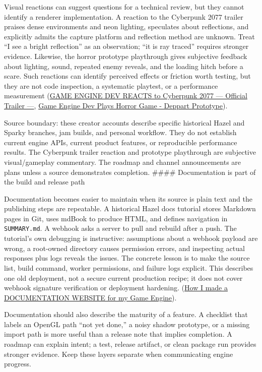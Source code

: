 Visual reactions can suggest questions for a technical review, but they cannot identify a renderer implementation. A reaction to the Cyberpunk 2077 trailer praises dense environments and neon lighting, speculates about reflections, and explicitly admits the capture platform and reflection method are unknown. Treat ``I see a bright reflection'' as an observation; ``it is ray traced'' requires stronger evidence. Likewise, the horror prototype playthrough gives subjective feedback about lighting, sound, repeated enemy reveals, and the loading hitch before a scare. Such reactions can identify perceived effects or friction worth testing, but they are not code inspection, a systematic playtest, or a performance measurement (\href{https://www.youtube.com/watch?v=ZyfFCIFHYuk&t=1m11s}{GAME ENGINE DEV REACTS to Cyberpunk 2077 --- Official Trailer ---}, \href{https://www.youtube.com/watch?v=Y3-p6MlTjLA&t=0m0s}{Game Engine Dev Plays Horror Game - Deppart Prototype}).

Source boundary: these creator accounts describe specific historical Hazel and Sparky branches, jam builds, and personal workflow. They do not establish current engine APIs, current product features, or reproducible performance results. The Cyberpunk trailer reaction and prototype playthrough are subjective visual/gameplay commentary. The roadmap and channel announcements are plans unless a source demonstrates completion. \#\#\#\# Documentation is part of the build and release path

Documentation becomes easier to maintain when its source is plain text and the publishing steps are repeatable. A historical Hazel docs tutorial stores Markdown pages in Git, uses mdBook to produce HTML, and defines navigation in \texttt{SUMMARY.md}. A webhook asks a server to pull and rebuild after a push. The tutorial's own debugging is instructive: assumptions about a webhook payload are wrong, a root-owned directory causes permission errors, and inspecting actual responses plus logs reveals the issues. The concrete lesson is to make the source list, build command, worker permissions, and failure logs explicit. This describes one old deployment, not a secure current production recipe; it does not cover webhook signature verification or deployment hardening. (\href{https://www.youtube.com/watch?v=tJDof3nrfHU&t=3m18s}{How I made a DOCUMENTATION WEBSITE for my Game Engine}).

Documentation should also describe the maturity of a feature. A checklist that labels an OpenGL path ``not yet done,'' a noisy shadow prototype, or a missing import path is more useful than a release note that implies completion. A roadmap can explain intent; a test, release artifact, or clean package run provides stronger evidence. Keep these layers separate when communicating engine progress.

